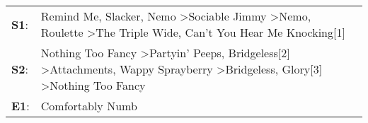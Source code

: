 \begin{supertabular}{p{0.03\textwidth}p{0.92\textwidth}}
 \textbf{S1}:  &                              Remind Me\textsuperscript{}, \enspace Slacker\textsuperscript{}, \enspace Nemo\textsuperscript{} \textgreater \enspace Sociable Jimmy\textsuperscript{} \textgreater \enspace Nemo\textsuperscript{}, \enspace Roulette\textsuperscript{} \textgreater \enspace The Triple Wide\textsuperscript{}, \enspace Can't You Hear Me Knocking[1]\textsuperscript{}  \enspace  \\
 \textbf{S2}:  &  Nothing Too Fancy\textsuperscript{} \textgreater \enspace Partyin' Peeps\textsuperscript{}, \enspace Bridgeless[2]\textsuperscript{} \textgreater \enspace Attachments\textsuperscript{}, \enspace Wappy Sprayberry\textsuperscript{} \textgreater \enspace Bridgeless\textsuperscript{}, \enspace Glory[3]\textsuperscript{} \textgreater \enspace Nothing Too Fancy\textsuperscript{}  \enspace  \\
 \textbf{E1}:  &                                                                                                                                                                                                                                                                                                                                                       Comfortably Numb\textsuperscript{}  \enspace  \\
\end{supertabular}
